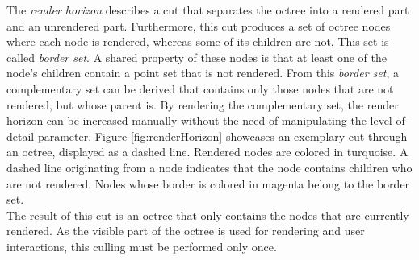 The \textit{render horizon} describes a cut that separates the octree into a rendered part and an unrendered part. Furthermore, this cut produces a set of octree nodes where each node is rendered, whereas some of its children are not. This set is called \textit{border set}. A shared property of these nodes is that at least one of the node's children contain a point set that is not rendered. From this \textit{border set}, a complementary set can be derived that contains only those nodes that are not rendered, but whose parent is. By rendering the complementary set, the render horizon can be increased manually without the need of manipulating the level-of-detail parameter. Figure \ref{fig:renderHorizon} showcases an exemplary cut through an octree, displayed as a dashed line. Rendered nodes are colored in turquoise. A dashed line originating from a node indicates that the node contains children who are not rendered. Nodes whose border is colored in magenta belong to the border set. 
\\
The result of this cut is an octree that only contains the nodes that are currently rendered. As the visible part of the octree is used for rendering and user interactions, this culling must be performed only once. 